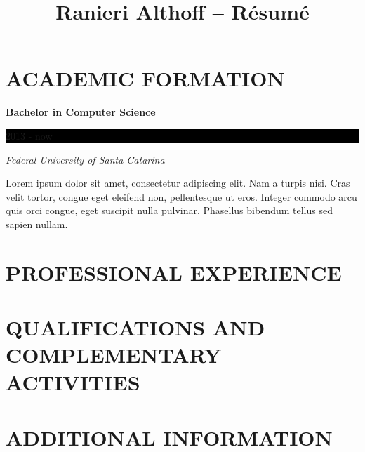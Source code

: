 \documentclass[10pt]{article}
\newcommand{\sectiontitle}[1]{\section*{\uppercase{#1}}}
\begin{document}
\title{Ranieri Althoff -- Résumé}

\sectiontitle{Academic Formation}
\textbf{Bachelor in Computer Science} \hfill
\colorbox{black}{
	\parbox{8em}{
		\hfill \color{white} 2013 - now
	}
} \par
\textit{Federal University of Santa Catarina} \par
\small Lorem ipsum dolor sit amet, consectetur adipiscing elit. Nam a turpis
	nisi. Cras velit tortor, congue eget eleifend non, pellentesque ut eros.
	Integer commodo arcu quis orci congue, eget suscipit nulla pulvinar.
	Phasellus bibendum tellus sed sapien nullam. \par
\normalsize
\vspace{1em}


\sectiontitle{Professional Experience}


\sectiontitle{Qualifications and Complementary Activities}


\sectiontitle{Additional Information}
\end{document}

